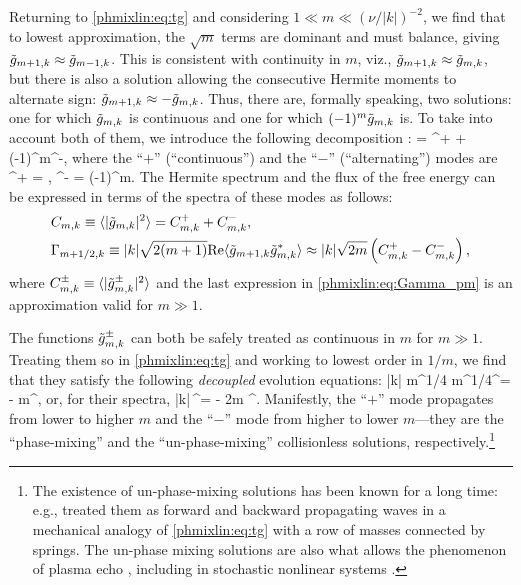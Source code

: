 Returning to \eqref{phmixlin:eq:tg} and considering $1\ll m\ll (\nu/|k|)^{-2}$, 
we find that to lowest approximation, the $\sqrt{m}$ terms are dominant 
and must balance, giving $\tilde g_{m+1,k}\approx\tilde g_{m-1,k}$. 
This is consistent with continuity in $m$, viz., $\tilde g_{m+1,k}\approx\tilde g_{m,k}$, 
but there is also a solution allowing the consecutive Hermite 
moments to alternate sign: $\tilde g_{m+1,k}\approx-\tilde g_{m,k}$. 
Thus, there are, formally speaking, two solutions: one for which 
$\tilde g_{m,k}$ is continuous and one for which $(-1)^m\tilde g_{m,k}$ is. To take into account 
both of them, we introduce the following decomposition 
\cite{schekochihin14}: 
\beq
\tgmk = \tgmk^+ + (-1)^m\tgmk^-,
\label{phmixlin:eq:decomp}
\eeq
where the ``$+$'' (``continuous'') and the ``$-$'' (``alternating'') modes are
\beq
\tgmk^+ = , \quad
\tgmk^- = (-1)^m.
\label{phmixlin:eq:gpm}
\eeq
The Hermite spectrum and the flux of the free energy can be expressed 
in terms of the spectra of these modes as follows: 
\begin{align}
&C_{m,k} \equiv \langle|\tilde g_{m,k}|^2\rangle = C_{m,k}^+ + C_{m,k}^-, \label{phmixlin:eq:free_energy}\\
&\Gamma_{m+1/2,k} \equiv |k|\sqrt{2(m+1)}{\rm Re}\langle\tilde g_{m+1,k}\tilde g_{m,k}^*\rangle 
\approx |k|\sqrt{2m}\left(C_{m,k}^+ - C_{m,k}^-\right),
\label{phmixlin:eq:Gamma_pm}
\end{align}
where $C_{m,k}^\pm\equiv \langle|\tilde g_{m,k}^\pm|^2\rangle$ and the last expression 
in \eqref{phmixlin:eq:Gamma_pm} is an approximation valid for $m\gg1$. 

The functions $\tilde g_{m,k}^\pm$ can both be safely treated as continuous in $m$ for $m\gg1$. 
Treating them so in \eqref{phmixlin:eq:tg} and working to lowest order in $1/m$, 
we find that they satisfy the following {\em decoupled} evolution equations: 
\beq
{} \pm {}|k| m^{1/4} m^{1/4}\tgmk^\pm = - \nu m\tgmk^\pm,
\label{phmixlin:eq:gpmevol}
\eeq 
or, for their spectra, 
\beq
{} \pm |k|\,\Cmk^\pm = - 2\nu m \Cmk^\pm.
\eeq
Manifestly, the ``$+$'' mode propagates from lower to higher $m$ and 
the ``$-$'' mode from higher to lower $m$---they are the ``phase-mixing'' and 
the ``un-phase-mixing'' collisionless solutions, respectively.\footnote{The existence 
of un-phase-mixing solutions has been known for a long time: e.g., 
\cite{hammett93} treated them as forward and backward propagating 
waves in a mechanical analogy of \eqref{phmixlin:eq:tg} with a row of masses 
connected by springs. The un-phase mixing solutions are also 
what allows the phenomenon of plasma echo \cite{gould67}, including 
in stochastic nonlinear systems \cite{schekochihin14}.}

